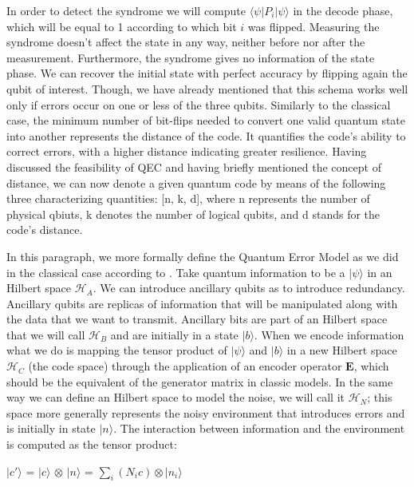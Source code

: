 \documentclass{Configuration_Files/PoliMi3i_thesis}
\begin{document}
In order to detect the syndrome we will compute $\langle \psi| P_i | \psi \rangle $ in the decode phase, which will be equal to 1 according to which bit $i$ was flipped.
Measuring the syndrome doesn't affect the state in any way, neither before nor after the measurement. Furthermore, the syndrome gives no information of the state phase. We can recover the initial state with perfect accuracy by flipping again the qubit of interest. Though, we have already mentioned that this schema works well only if errors occur on one or less of the three qubits.\newline
Similarly to the classical case, the minimum number of bit-flips needed to convert one valid quantum state into another represents the distance of the code. It quantifies the code's ability to correct errors, with a higher distance indicating greater resilience.
Having discussed the feasibility of QEC and having briefly mentioned the concept of distance, we can now denote a given quantum code by means of the following three characterizing quantities: [n, k, d], where n represents the number of physical qbiuts, k denotes the number of logical qubits, and d stands for the code's distance. \newline

In this paragraph, we more formally define the Quantum Error Model as we did in the classical case according to \cite{Cha06}. 
Take quantum information to be a $|\psi \rangle$ in an Hilbert space $\mathscr{H}_A$. We can introduce ancillary qubits as to introduce redundancy. Ancillary qubits are replicas of information that will be manipulated along with the data that we want to transmit.
Ancillary bits are part of an Hilbert space that we will call $\mathscr{H}_B$ and are initially in a state $|b \rangle$. When we encode information what we do is mapping the tensor product of $|\psi \rangle$ and $|b \rangle$ in a new Hilbert space $\mathscr{H}_C$ (the code space) through the application of an encoder operator $\textbf{E}$, which should be the equivalent of the generator matrix in classic models. In the same way we can define an Hilbert space to model the noise, we will call it $\mathscr{H}_N$; this space more generally represents the noisy environment that introduces errors and is initially in state $|n \rangle$. The interaction between information and the environment is computed as the tensor product:

\begin{center}
	$|c' \rangle$ = $|c \rangle$ $\otimes$ $|n \rangle$ = $\sum_{i} (N_i c) \otimes |n_i \rangle $
\end{center}
\end{document}
